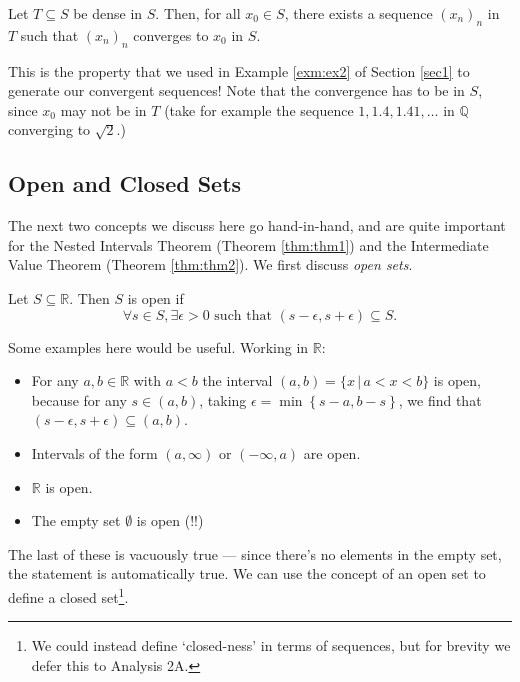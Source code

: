 \documentclass[
  12pt,
  a4paper]{extarticle}
\providecommand{\tightlist}{%
  \setlength{\itemsep}{0pt}\setlength{\parskip}{0pt}}
\theoremstyle{plain}
\theoremstyle{plain}
\theoremstyle{plain}
\theoremstyle{plain}
\theoremstyle{plain}
\theoremstyle{definition}
\theoremstyle{definition}
\theoremstyle{definition}
\theoremstyle{remark}
\let\BeginKnitrBlock\begin \let\EndKnitrBlock\end
\renewcommand{\;}{\,}
\begin{document}
\BeginKnitrBlock{proposition}
{\label{prp:prop1} }Let \(T \subseteq S\) be dense in \(S\). Then, for all \(x_0 \in S\), there exists a sequence \((x_n)_n\) in \(T\) such that \((x_n)_n\) converges to \(x_0\) in \(S\).
\EndKnitrBlock{proposition}
This is the property that we used in Example \ref{exm:ex2} of Section \ref{sec1} to generate our convergent sequences! Note that the convergence has to be in \(S\), since \(x_0\) may not be in \(T\) (take for example the sequence \(1, 1.4, 1.41,\ldots\) in \(\mathbb{Q}\) converging to \(\sqrt{2}\).)

\hypertarget{open-and-closed-sets}{%
\subsection{Open and Closed Sets}\label{open-and-closed-sets}}

The next two concepts we discuss here go hand-in-hand, and are quite important for the Nested Intervals Theorem (Theorem \ref{thm:thm1}) and the Intermediate Value Theorem (Theorem \ref{thm:thm2}). We first discuss \emph{open sets}.

\BeginKnitrBlock{definition}[Open Set]
{\label{def:def4} }Let \(S \subseteq \mathbb{R}\). Then \(S\) is open if \[\forall s \in S, \exists \epsilon > 0 \;\; \text{such that} \;\; (s-\epsilon,s+\epsilon) \subseteq S.\]
\EndKnitrBlock{definition}
Some examples here would be useful. Working in \(\mathbb{R}\):

\begin{itemize}
\tightlist
\item
  For any \(a,b \in \mathbb{R}\) with \(a < b\) the interval \((a,b) = \lbrace x \;\lvert\; a < x < b \rbrace\) is open, because for any \(s \in (a,b)\), taking \(\epsilon = \min\left\lbrace s-a, b-s\right\rbrace\), we find that \((s-\epsilon, s + \epsilon) \subseteq (a,b)\).
\item
  Intervals of the form \((a, \infty)\) or \((-\infty, a)\) are open.
\item
  \(\mathbb{R}\) is open.
\item
  The empty set \(\emptyset\) is open (!!)
\end{itemize}

The last of these is vacuously true --- since there's no elements in the empty set, the statement is automatically true. We can use the concept of an open set to define a closed set\footnote{We could instead define `closed-ness' in terms of sequences, but for brevity we defer this to Analysis 2A.}.
\end{document}
